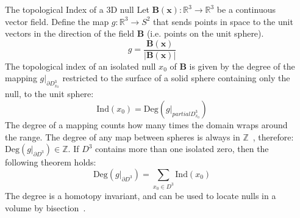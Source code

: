 \documentclass[final]{beamer}
\newlength{\onecolwid}
\newlength{\twocolwid}
\begin{document}
\begin{frame}[t]
\begin{columns}[t]
\begin{column}{\twocolwid}
\begin{columns}[t,totalwidth=\twocolwid]
\begin{column}{\onecolwid}\vspace{-.6in} %


\begin{block}{The topological Index of a 3D null}
    Let $\mathbf{B}(\mathbf{x}): \mathbb{R}^3\rightarrow \mathbb{R}^3$ be a continuous
    vector field.
    Define the map $g:\mathbb{R}^3\rightarrow S^2$ that sends points in
    space to the unit vectors in the direction of the field $\mathbf{B}$
    (i.e. points on the unit sphere).
    \begin{equation}\label{eq:director}
        g = \frac{\mathbf{B}(\mathbf{x})}{|\mathbf{B}(\mathbf{x})|}
    \end{equation}
    The topological index of an isolated null $x_0$ of $\mathbf{B}$ is given by
    the degree of the mapping $g|_{\partial D^3_{x_0}}$ restricted to the surface of
    a solid sphere containing only the null, to the unit sphere:
    \begin{equation}\label{eq:index1}
        \mathrm{Ind}(x_0)=\mathrm{Deg}(g|_{partial D^3_{x_0}})
    \end{equation}
    The degree of a mapping counts how many times the domain wraps around the range.
    The degree of any map between spheres is always in
    $\mathbb{Z}$~\cite{brouwer1911abbildung}, therefore:
    $\mathrm{Deg}(g|_{\partial D^3})\in\mathbb{Z}$.
    If $D^3$ contains more than one isolated zero, then the following theorem holds:
    \begin{equation}\label{eq:indextheorem}
        \mathrm{Deg}(g|_{\partial D^3})= \sum_{x_0\in D^3} \mathrm{Ind}(x_0)
    \end{equation}
    The degree is a homotopy invariant, and can be used to locate nulls in a volume by
    bisection~\cite{greene1992locating}.

\end{block}


\end{column} %

\begin{column}{\onecolwid}\vspace{-.6in} %


\end{column}
\end{columns}
\end{column}
\end{columns}
\end{frame}
\end{document}
